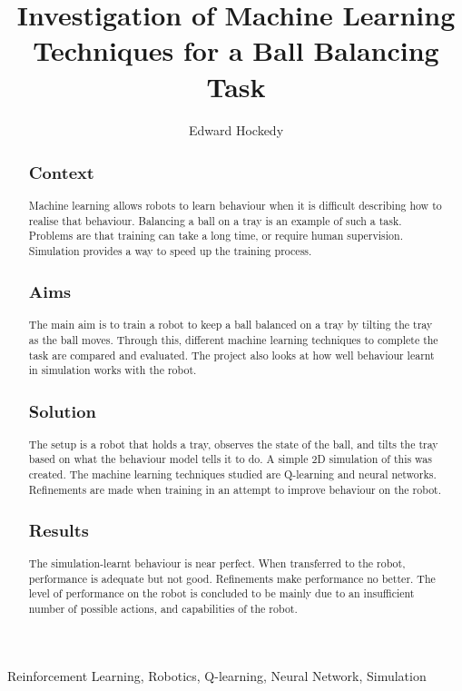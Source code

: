 \documentclass[12pt,a4paper]{article}
\title{Investigation of Machine Learning Techniques for a Ball Balancing Task}
\author{Edward Hockedy}
\date{}
\begin{document}
\maketitle

\begin{abstract}
\subsection{Context}
Machine learning allows robots to learn behaviour when it is difficult describing how to realise that behaviour. Balancing a ball on a tray is an example of such a task. Problems are that training can take a long time, or require human supervision. Simulation provides a way to speed up the training process. 

\subsection{Aims}
The main aim is to train a robot to keep a ball balanced on a tray by tilting the tray as the ball moves. Through this, different machine learning techniques to complete the task are compared and evaluated. The project also looks at how well behaviour learnt in simulation works with the robot.

\subsection{Solution}
The setup is a robot that holds a tray, observes the state of the ball, and tilts the tray based on what the behaviour model tells it to do. A simple 2D simulation of this was created. The machine learning techniques studied are Q-learning and neural networks. Refinements are made when training in an attempt to improve behaviour on the robot.

\subsection{Results}
The simulation-learnt behaviour is near perfect. When transferred to the robot, performance is adequate but not good. Refinements make performance no better. The level of performance on the robot is concluded to be mainly due to an insufficient number of possible actions, and capabilities of the robot.

\end{abstract}

\begin{keywords}
Reinforcement Learning, Robotics, Q-learning, Neural Network, Simulation
\end{keywords}
\end{document}
